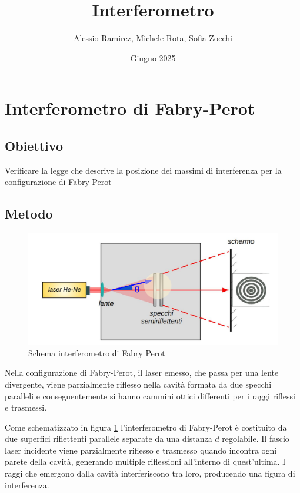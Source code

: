 \documentclass[a4paper]{article}
\title{Interferometro}
\author{Alessio Ramirez, Michele Rota, Sofia Zocchi}
\date{Giugno 2025}
\begin{document}
\maketitle
\tableofcontents
\newpage

\section{Interferometro di Fabry-Perot}
\subsection{Obiettivo}
Verificare la legge che descrive la posizione dei massimi di interferenza per la configurazione di Fabry-Perot

\subsection{Metodo}

\begin{figure}[htbp]
\centering
\includegraphics[width=1.0\textwidth]{./grafici/fabry_perot_immagine}
\caption{Schema interferometro di Fabry Perot}
\label{fig:fabry-perot-schema}
\end{figure}
Nella configurazione di Fabry-Perot, il laser emesso, che passa per una lente divergente, viene parzialmente riflesso nella cavità formata da due specchi paralleli e conseguentemente si hanno cammini ottici differenti per i raggi riflessi e trasmessi. 

Come schematizzato in figura \ref{fig:fabry-perot-schema} l'interferometro di Fabry-Perot è costituito da due superfici riflettenti parallele separate da una distanza $d$ regolabile. Il fascio laser incidente viene parzialmente riflesso e trasmesso quando incontra ogni parete della cavità, generando multiple riflessioni all'interno di quest'ultima. I raggi che emergono dalla cavità interferiscono tra loro, producendo una figura di interferenza.
\end{document}
